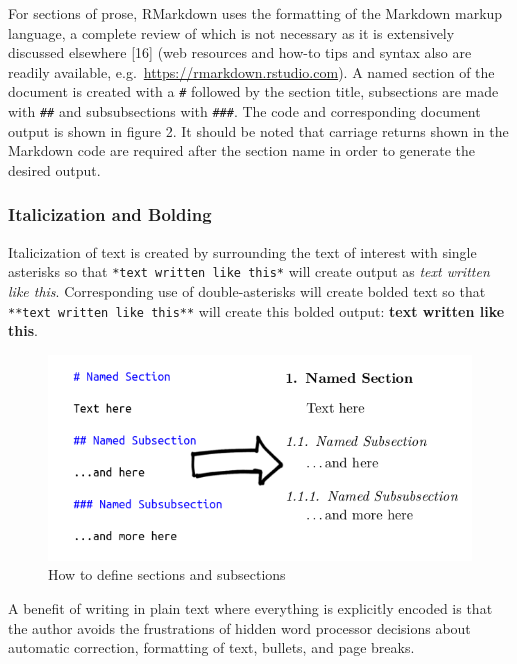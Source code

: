\documentclass[]{elsarticle} %
\begin{document}
For sections of prose, RMarkdown uses the formatting of the Markdown
markup language, a complete review of which is not necessary as it is
extensively discussed elsewhere {[}16{]} (web resources and how-to tips
and syntax also are readily available,
e.g.~\url{https://rmarkdown.rstudio.com}). A named section of the
document is created with a \texttt{\#} followed by the section title,
subsections are made with \texttt{\#\#} and subsubsections with
\texttt{\#\#\#}. The code and corresponding document output is shown in
figure 2. It should be noted that carriage returns shown in the Markdown
code are required after the section name in order to generate the
desired output.

\hypertarget{italicization-and-bolding}{%
\subsubsection{Italicization and
Bolding}\label{italicization-and-bolding}}

Italicization of text is created by surrounding the text of interest
with single asterisks so that \texttt{*text\ written\ like\ this*} will
create output as \emph{text written like this}. Corresponding use of
double-asterisks will create bolded text so that
\texttt{**text\ written\ like\ this**} will create this bolded output:
\textbf{text written like this}.

\begin{figure}[H]

{\centering \includegraphics[width=0.75\linewidth,]{Figures/Figure2} 

}

\caption{How to define sections and subsections}\label{fig:fig2}
\end{figure}

A benefit of writing in plain text where everything is explicitly
encoded is that the author avoids the frustrations of hidden word
processor decisions about automatic correction, formatting of text,
bullets, and page breaks.
\end{document}

